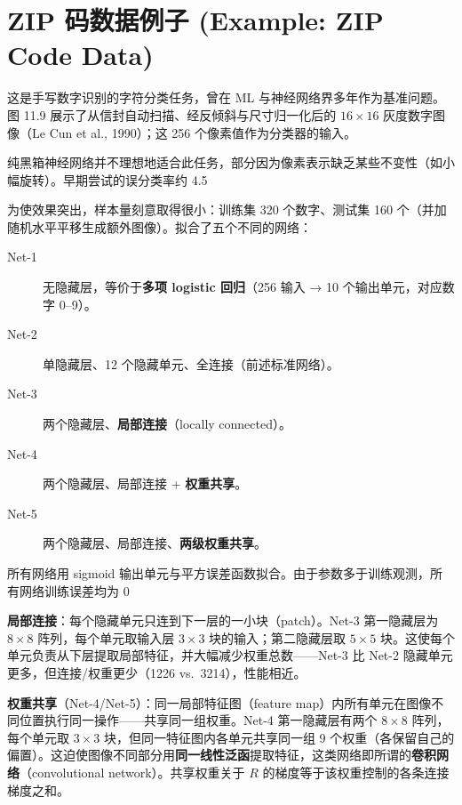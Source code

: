 \section{ZIP 码数据例子 (Example: ZIP Code Data)}

这是手写数字识别的字符分类任务，曾在 ML 与神经网络界多年作为基准问题。图 11.9 展示了从信封自动扫描、经反倾斜与尺寸归一化后的 $16\times 16$ 灰度数字图像（Le Cun et al., 1990）；这 256 个像素值作为分类器的输入。

纯黑箱神经网络并不理想地适合此任务，部分因为像素表示缺乏某些不变性（如小幅旋转）。早期尝试的误分类率约 4.5%

为使效果突出，样本量刻意取得很小：训练集 320 个数字、测试集 160 个（并加随机水平平移生成额外图像）。拟合了五个不同的网络：

\begin{description}
\item[Net-1] 无隐藏层，等价于\textbf{多项 logistic 回归}（256 输入 → 10 个输出单元，对应数字 0--9）。
\item[Net-2] 单隐藏层、12 个隐藏单元、全连接（前述标准网络）。
\item[Net-3] 两个隐藏层、\textbf{局部连接}（locally connected）。
\item[Net-4] 两个隐藏层、局部连接 + \textbf{权重共享}。
\item[Net-5] 两个隐藏层、局部连接、\textbf{两级权重共享}。
\end{description}

所有网络用 sigmoid 输出单元与平方误差函数拟合。由于参数多于训练观测，所有网络训练误差均为 0%

\begin{remark}[局部连接与卷积网络]
\textbf{局部连接}：每个隐藏单元只连到下一层的一小块（patch）。Net-3 第一隐藏层为 $8\times 8$ 阵列，每个单元取输入层 $3\times 3$ 块的输入；第二隐藏层取 $5\times 5$ 块。这使每个单元负责从下层提取局部特征，并大幅减少权重总数——Net-3 比 Net-2 隐藏单元更多，但连接/权重更少（1226 vs.\ 3214），性能相近。

\textbf{权重共享}（Net-4/Net-5）：同一局部特征图（feature map）内所有单元在图像不同位置执行同一操作——共享同一组权重。Net-4 第一隐藏层有两个 $8\times 8$ 阵列，每个单元取 $3\times 3$ 块，但同一特征图内各单元共享同一组 9 个权重（各保留自己的偏置）。这迫使图像不同部分用\textbf{同一线性泛函}提取特征，这类网络即所谓的\textbf{卷积网络}（convolutional network）。共享权重关于 $R$ 的梯度等于该权重控制的各条连接梯度之和。
\end{remark}

